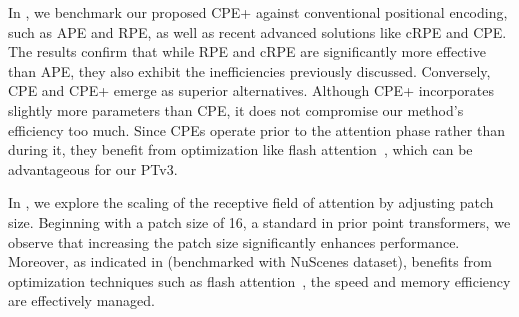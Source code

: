 In , we benchmark our proposed CPE+ against conventional positional encoding, such as APE and RPE, as well as recent advanced solutions like cRPE and CPE. The results confirm that while RPE and cRPE are significantly more effective than APE, they also exhibit the inefficiencies previously discussed. Conversely, CPE and CPE+ emerge as superior alternatives. Although CPE+ incorporates slightly more parameters than CPE, it does not compromise our method's efficiency too much. Since CPEs operate prior to the attention phase rather than during it, they benefit from optimization like flash attention~\cite{dao2022flashattention, dao2023flashattention2}, which can be advantageous for our PTv3.

In , we explore the scaling of the receptive field of attention by adjusting patch size. Beginning with a patch size of 16, a standard in prior point transformers, we observe that increasing the patch size significantly enhances performance. Moreover, as indicated in  (benchmarked with NuScenes dataset), benefits from optimization techniques such as flash attention~\cite{dao2022flashattention, dao2023flashattention2}, the speed and memory efficiency are effectively managed.

\begin{table}[t]
    \begin{minipage}{0.48\textwidth}
    \centering
        
        \vspace{-3mm}
        \caption{\textbf{Outdoor semantic segmentation.}}\label{tab:outdoor_sem_seg}
        \vspace{2mm}
    \end{minipage} \\
    \begin{minipage}{0.48\textwidth}
    \centering
        
        \vspace{-3mm}
        \caption{\textbf{Indoor instance segmentation.}}\label{tab:indoor_ins_seg}
        \vspace{2mm}
    \end{minipage} \\
    \begin{minipage}{0.48\textwidth}
    \centering
        
        \vspace{-3mm}
        \caption{\textbf{Data efficiency.}}\label{tab:data_efficient}
        \vspace{-4mm}
    \end{minipage}
\end{table}

